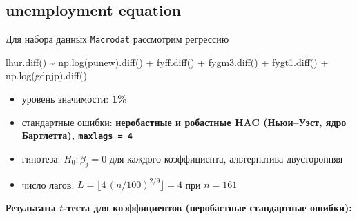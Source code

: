 \documentclass[
  russian,
]{article}
\newenvironment{Shaded}{\begin{snugshade}}{\end{snugshade}}
\newcommand{\NormalTok}[1]{\textcolor[rgb]{0.00,0.23,0.31}{#1}}
\newcommand{\OperatorTok}[1]{\textcolor[rgb]{0.37,0.37,0.37}{#1}}
\providecommand{\tightlist}{%
  \setlength{\itemsep}{0pt}\setlength{\parskip}{0pt}}
\begin{document}
\subsection{unemployment equation}\label{unemployment-equation-1}

Для набора данных \texttt{Macrodat} рассмотрим регрессию

\begin{Shaded}
\begin{Highlighting}[]
\NormalTok{lhur.diff() }\OperatorTok{\textasciitilde{}}\NormalTok{ np.log(punew).diff() }\OperatorTok{+}\NormalTok{ fyff.diff() }\OperatorTok{+}\NormalTok{ fygm3.diff() }\OperatorTok{+}
\NormalTok{              fygt1.diff() }\OperatorTok{+}\NormalTok{ np.log(gdpjp).diff()}
\end{Highlighting}
\end{Shaded}

\begin{tcolorbox}[enhanced jigsaw, arc=.35mm, bottomrule=.15mm, bottomtitle=1mm, breakable, colback=white, colbacktitle=quarto-callout-important-color!10!white, colframe=quarto-callout-important-color-frame, coltitle=black, left=2mm, leftrule=.75mm, opacityback=0, opacitybacktitle=0.6, rightrule=.15mm, title=\textcolor{quarto-callout-important-color}{\faExclamation}\hspace{0.5em}{Условия теста}, titlerule=0mm, toprule=.15mm, toptitle=1mm]

\begin{itemize}
\tightlist
\item
  уровень значимости: \textbf{1\%}
\item
  стандартные ошибки: \textbf{неробастные и робастные HAC (Ньюи--Уэст,
  ядро Бартлетта), \texttt{maxlags\ =\ 4}}
\item
  гипотеза: \(H_0:\beta_j=0\) для каждого коэффициента, альтернатива
  двусторонняя
\item
  число лагов: \(L=\lfloor 4\,(n/100)^{2/9}\rfloor = 4\) при \(n=161\)
\end{itemize}

\end{tcolorbox}

\textbf{Результаты \(t\)-теста для коэффициентов (неробастные
стандартные ошибки):}
\end{document}
